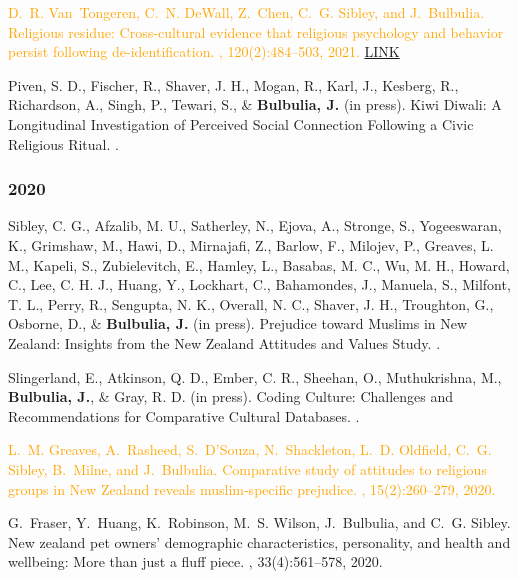 \documentclass{article}
\begin{document}
\begin{thebibliography}{99}
\textcolor{Orange}{D.~R. Van~Tongeren, C.~N. DeWall, Z.~Chen, C.~G. Sibley, and J.~Bulbulia.
\newblock Religious residue: {Cross}-cultural evidence that religious
  psychology and behavior persist following de-identification.
, 120(2):484--503,
  2021.} \href{https://www.dropbox.com/s/dyxqtxui4fqvy5u/VanTongerenEtAL2021JPSP.pdf?dl=0}{LINK}


 Piven, S. D., Fischer, R., Shaver, J. H., Mogan, R., Karl, J., Kesberg, R., Richardson, A., Singh, P., Tewari, S., \& {\bf Bulbulia, J.} (in press).
\newblock Kiwi Diwali: A Longitudinal Investigation of Perceived Social Connection Following a Civic Religious Ritual.
.


\subsubsection*{2020}


 Sibley, C. G., Afzalib, M. U., Satherley, N., Ejova, A., Stronge, S., Yogeeswaran, K., Grimshaw, M., Hawi, D., Mirnajafi, Z., Barlow, F., Milojev, P., Greaves, L. M., Kapeli, S., Zubielevitch, E., Hamley, L., Basabas, M. C., Wu, M. H., Howard, C., Lee, C. H. J., Huang, Y., Lockhart, C., Bahamondes, J., Manuela, S., Milfont, T. L., Perry, R., Sengupta, N. K., Overall, N. C., Shaver, J. H., Troughton, G., Osborne, D., \& {\bf Bulbulia, J.} (in press). 
\newblock Prejudice toward Muslims in New Zealand: Insights from the New Zealand Attitudes and Values Study.
.


 Slingerland, E., Atkinson, Q. D., Ember, C. R., Sheehan, O., Muthukrishna, M., {\bf Bulbulia, J.}, \& Gray, R. D. (in press). 
\newblock Coding Culture: Challenges and Recommendations for Comparative Cultural Databases.
. 


\textcolor{Orange}{L.~M. Greaves, A.~Rasheed, S.~D'Souza, N.~Shackleton, L.~D. Oldfield, C.~G.
  Sibley, B.~Milne, and J.~Bulbulia.
\newblock Comparative study of attitudes to religious groups in New Zealand
  reveals muslim-specific prejudice.
,
  15(2):260--279, 2020.}

G.~Fraser, Y.~Huang, K.~Robinson, M.~S. Wilson, J.~Bulbulia, and C.~G. Sibley.
\newblock New zealand pet owners' demographic characteristics, personality, and
  health and wellbeing: More than just a fluff piece.
, 33(4):561--578, 2020.



\end{thebibliography}
\end{document}
